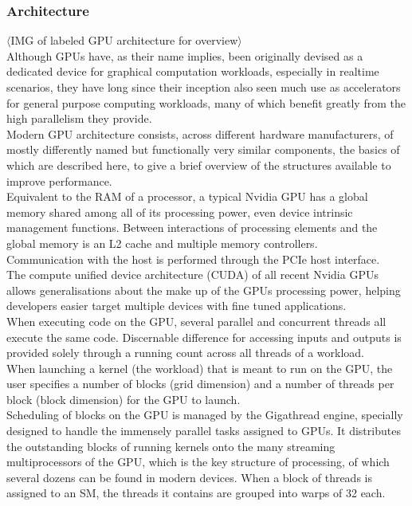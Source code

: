 \documentclass{tudscrreprt}
\newcommand{\markr}[1]{\textcolor{review}{$\langle$#1$\rangle$}}
\begin{document}
			\subsubsection{Architecture}
				\markr{IMG of labeled GPU architecture for overview}\\
				Although GPUs have, as their name implies, been originally devised as a dedicated device for graphical computation workloads, especially in realtime scenarios, they have long since their inception also seen much use as accelerators for general purpose computing workloads, many of which benefit greatly from the high parallelism they provide. \\
				Modern GPU architecture consists, across different hardware manufacturers, of mostly differently named but functionally very similar components, the basics of which are described here, to give a brief overview of the structures available to improve performance. \\
				
				Equivalent to the RAM of a processor, a typical Nvidia GPU has a global memory shared among all of its processing power, even device intrinsic management functions. Between interactions of processing elements and the global memory is an L2 cache and multiple memory controllers. \\
				Communication with the host is performed through the PCIe host interface. \\
				
				The compute unified device architecture (CUDA) of all recent Nvidia GPUs allows generalisations about the make up of the GPUs processing power, helping developers easier target multiple devices with fine tuned applications. \\
				
				When executing code on the GPU, several parallel and concurrent threads all execute the same code. Discernable difference for accessing inputs and outputs is provided solely through a running count across all threads of a workload. \\
				When launching a kernel (the workload) that is meant to run on the GPU, the user specifies a number of blocks (grid dimension) and a number of threads per block (block dimension) for the GPU to launch. \\
				Scheduling of blocks on the GPU is managed by the Gigathread engine, specially designed to handle the immensely parallel tasks assigned to GPUs. It distributes the outstanding blocks of running kernels onto the many streaming multiprocessors of the GPU, which is the key structure of processing, of which several dozens can be found in modern devices. When a block of threads is assigned to an SM, the threads it contains are grouped into warps of 32 each. \\
				
\end{document}
